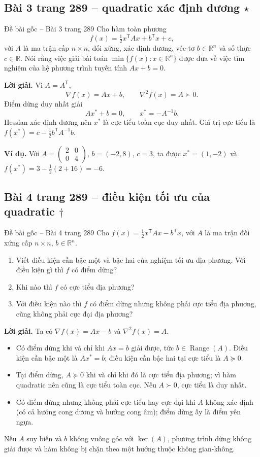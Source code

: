 \documentclass[11pt,a4paper]{article}
\newcommand{\R}{\mathbb{R}}
\newcommand{\grad}{\nabla}
\newcommand{\Hess}{\nabla^2}
\newcommand{\T}{^{\mathsf T}}
\begin{document}
\subsection{Bài 3 trang 289 -- quadratic xác định dương \(\star\)}
\begin{questionbox}{Đề bài gốc -- Bài 3 trang 289}
Cho hàm toàn phương
\[
f(x)=\tfrac12x\T Ax+b\T x+c,
\]
với \(A\) là ma trận cấp \(n\times n\), đối xứng, xác định dương, véc-tơ \(b\in\R^n\) và số thực \(c\in\R\). Nói rằng việc giải bài toán \(\min\{f(x):x\in\R^n\}\) được đưa về việc tìm nghiệm của hệ phương trình tuyến tính \(Ax+b=0\).
\end{questionbox}
\textbf{Lời giải.} Vì \(A=A\T\),
\[
\grad f(x)=Ax+b,\qquad \Hess f(x)=A\succ0.
\]
Điểm dừng duy nhất giải
\[
Ax^\ast+b=0,\qquad x^\ast=-A^{-1}b.
\]
Hessian xác định dương nên \(x^\ast\) là cực tiểu toàn cục duy nhất. Giá trị cực tiểu là \(f(x^\ast)=c-\tfrac12b\T A^{-1}b\).

\textbf{Ví dụ.} Với \(A=\begin{pmatrix}2&0\\0&4\end{pmatrix}\), \(b=(-2,8)\), \(c=3\), ta được \(x^\ast=(1,-2)\) và \(f(x^\ast)=3-\tfrac12(2+16)=-6\).

\subsection{Bài 4 trang 289 -- điều kiện tối ưu của quadratic \(\dagger\)}
\begin{questionbox}{Đề bài gốc -- Bài 4 trang 289}
Cho \(f(x)=\tfrac12x\T Ax-b\T x\), với \(A\) là ma trận đối xứng cấp \(n\times n\), \(b\in\R^n\).
\begin{enumerate}[label=\roman*),nosep,leftmargin=*]
\item Viết điều kiện cần bậc một và bậc hai của nghiệm tối ưu địa phương. Với điều kiện gì thì \(f\) có điểm dừng?
\item Khi nào thì \(f\) có cực tiểu địa phương?
\item Với điều kiện nào thì \(f\) có điểm dừng nhưng không phải cực tiểu địa phương, cũng không phải cực đại địa phương?
\end{enumerate}
\end{questionbox}
\textbf{Lời giải.} Ta có \(\grad f(x)=Ax-b\) và \(\Hess f(x)=A\).
\begin{itemize}
\item Có điểm dừng khi và chỉ khi \(Ax=b\) giải được, tức \(b\in\operatorname{Range}(A)\). Điều kiện cần bậc một là \(Ax^\ast=b\); điều kiện cần bậc hai tại cực tiểu là \(A\succeq0\).
\item Tại điểm dừng, \(A\succeq0\) khi và chỉ khi đó là cực tiểu địa phương; vì hàm quadratic nên cũng là cực tiểu toàn cục. Nếu \(A\succ0\), cực tiểu là duy nhất.
\item Có điểm dừng nhưng không phải cực tiểu hay cực đại khi \(A\) không xác định (có cả hướng cong dương và hướng cong âm); điểm dừng ấy là điểm yên ngựa.
\end{itemize}
Nếu \(A\) suy biến và \(b\) không vuông góc với \(\ker(A)\), phương trình dừng không giải được và hàm không bị chặn theo một hướng thuộc không gian-không.
\end{document}
